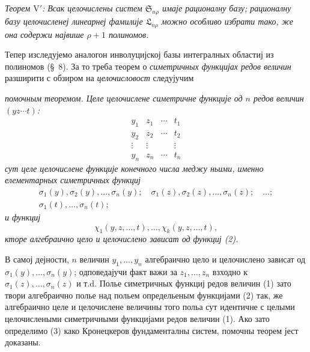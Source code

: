 ﻿\documentclass[11pt]{article}
\providecommand{\Ssys}{\mathfrak{S}}
\providecommand{\Lsys}{\mathfrak{L}}
\begin{document}
{\itshape Теорем $\mathrm{V}'$: Всак целочислены систем $\Ssys_{n\rho}$ имаје рационалну базу; рационалну базу целочисленеј линеарнеј фамилије $\Lsys_{n\rho}$ можно особливо избрати тако, же она содержи највише $\rho+1$ полиномов.}

Тепер изследујемо аналогон инволуцијској базы интегралных областиј из полиномов (\S\ 8). За то треба теорем о {\itshape симетричных функцијах редов величин} разширити с обзиром на {\itshape целочисловост} следујучим

{\itshape помочным теоремом. Целе целочислене симетричне функције од $n$ редов величин $(yz\cdots t)$:}
\begin{equation}
\begin{array}{cccc}
  y_1&z_1&\cdots&t_1\\
  y_2&z_2&\cdots&t_2\\
  \vdots&\vdots&&\vdots\\
  y_n&z_n&\cdots&t_n
\end{array}
\tag{1}
\end{equation}
{\itshape сут целе целочислене функције конечного числа меджу ньими, именно елементарных симетричных функциј}
\begin{equation}
\begin{gathered}
  \sigma_1(y),\sigma_2(y),\ldots,\sigma_n(y);\quad
  \sigma_1(z),\sigma_2(z),\ldots,\sigma_n(z);\quad\ldots;\\
  \sigma_1(t),\ldots,\sigma_n(t);
\end{gathered}
\tag{2}
\end{equation}
{\itshape и функциј}
\begin{equation}
  \chi_1(y,z,\ldots,t),\ldots,\chi_k(y,z,\ldots,t),
\tag{3}
\end{equation}
{\itshape кторе алгебраично цело и целочислено зависат од функциј (2).}

В самој дејности, $n$ величин $y_1,\ldots,y_n$ алгебраично цело и целочислено зависат од $\sigma_1(y),\ldots,\sigma_n(y)$; одповедајучи факт важи за $z_1,\ldots,z_n$ взходно к $\sigma_1(z),\ldots,\sigma_n(z)$ и т.d. Полье симетричных функциј редов величин (1) зато твори алгебраично полье над польем определьеным функцијами (2) так, же алгебраично целе и целочислене величины того польа сут идентичне с целыми целочислеными симетричными функцијами редов величин (1). Ако зато определимо (3) како Кронецкеров фундаменталны систем, помочны теорем јест доказаны.
\end{document}
